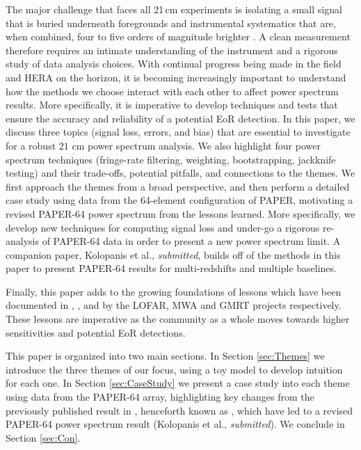 \documentclass[preprint2,numberedappendix,tighten]{aastex6}  %
\begin{document}
The major challenge that faces all 21\,cm experiments is isolating a small signal that is buried underneath foregrounds and 
instrumental systematics that are, when combined, four to five orders of magnitude brighter \citep[e.g.,][]{santos_et_al2005, ali_et_al2008, deOliveiraCosta_et_al2008, jelic_et_al2008, bernardi_et_al2009, bernardi_et_al2010, ghosh_et_al2011, pober_et_al2013, bernardi_et_al2013, dillon_et_al2014, kohn_et_al2016}. A clean measurement therefore requires an intimate understanding of the instrument and a rigorous study of data analysis choices. With continual progress being made 
in the field and HERA on the horizon, it is becoming increasingly important to understand how the methods we choose interact 
with each other to affect power spectrum results. More specifically, it is imperative to develop techniques and tests that ensure 
the accuracy and reliability of a potential EoR detection. In this paper, we discuss three topics (signal loss, errors, and bias) that are essential to investigate 
for a robust $21$ cm power spectrum analysis. We also highlight four power spectrum techniques (fringe-rate filtering, weighting, bootstrapping, jackknife testing) and their trade-offs, potential 
pitfalls, and connections to the themes. We first approach the themes from a broad perspective, and then perform a detailed 
case study using data from the 64-element configuration of PAPER, motivating a revised PAPER-64 power spectrum 
from the lessons learned. More specifically, we develop new techniques for computing signal loss and under-go a rigorous re-analysis of PAPER-64 data in order to present a new power spectrum limit. A companion paper, Kolopanis et al., \textit{submitted}, builds off of the methods in this paper to present PAPER-64 results for multi-redshifts and multiple baselines.

Finally, this paper adds to the growing foundations of lessons which have been documented in  \citet{Patil2016}, \citet{Jacobs2016}, and \cite{Paciga2013} by the LOFAR, MWA and GMRT projects respectively. These lessons are imperative as the community as a whole moves towards higher sensitivities and potential EoR detections.

This paper is organized into two main sections. In Section \ref{sec:Themes} we introduce the three themes of our focus, using a 
toy model to develop intuition for each one. In Section \ref{sec:CaseStudy} we present a case study into each theme using data 
from the PAPER-64 array, highlighting key changes from the previously published result in \citet{ali_et_al2015}, henceforth known as , which have led to a 
revised PAPER-64 power spectrum result (Kolopanis et al., \textit{submitted}). We conclude in Section \ref{sec:Con}.
\end{document}
